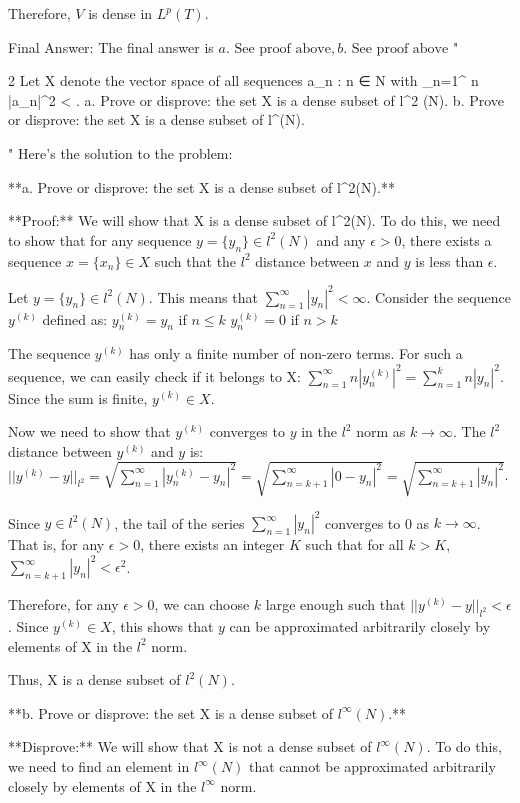     Therefore, $V$ is dense in $L^p(T)$.

Final Answer: The final answer is $\boxed{a. \text{ See proof above}, b. \text{ See proof above}}$
"

2 Let X denote the vector space of all sequences {a_n : n ∈ N} with \sum_{n=1}^{\infty} n |a_n|^2 < \infty.
a. Prove or disprove: the set X is a dense subset of l^2 (N).
b. Prove or disprove: the set X is a dense subset of l^{\infty}(N).

"
Here's the solution to the problem:

**a. Prove or disprove: the set X is a dense subset of l^2(N).**

**Proof:** We will show that X is a dense subset of l^2(N). To do this, we need to show that for any sequence $y = \{y_n\} \in l^2(N)$ and any $\epsilon > 0$, there exists a sequence $x = \{x_n\} \in X$ such that the $l^2$ distance between $x$ and $y$ is less than $\epsilon$.

Let $y = \{y_n\} \in l^2(N)$. This means that $\sum_{n=1}^{\infty} |y_n|^2 < \infty$.
Consider the sequence $y^{(k)}$ defined as:
$y^{(k)}_n = y_n$ if $n \le k$
$y^{(k)}_n = 0$ if $n > k$

The sequence $y^{(k)}$ has only a finite number of non-zero terms. For such a sequence, we can easily check if it belongs to X:
$\sum_{n=1}^{\infty} n |y^{(k)}_n|^2 = \sum_{n=1}^{k} n |y_n|^2$. Since the sum is finite, $y^{(k)} \in X$.

Now we need to show that $y^{(k)}$ converges to $y$ in the $l^2$ norm as $k \to \infty$. The $l^2$ distance between $y^{(k)}$ and $y$ is:
$||y^{(k)} - y||_{l^2} = \sqrt{\sum_{n=1}^{\infty} |y^{(k)}_n - y_n|^2} = \sqrt{\sum_{n=k+1}^{\infty} |0 - y_n|^2} = \sqrt{\sum_{n=k+1}^{\infty} |y_n|^2}$.

Since $y \in l^2(N)$, the tail of the series $\sum_{n=1}^{\infty} |y_n|^2$ converges to 0 as $k \to \infty$. That is, for any $\epsilon > 0$, there exists an integer $K$ such that for all $k > K$, $\sum_{n=k+1}^{\infty} |y_n|^2 < \epsilon^2$.

Therefore, for any $\epsilon > 0$, we can choose $k$ large enough such that $||y^{(k)} - y||_{l^2} < \epsilon$. Since $y^{(k)} \in X$, this shows that $y$ can be approximated arbitrarily closely by elements of X in the $l^2$ norm.

Thus, X is a dense subset of $l^2(N)$.

**b. Prove or disprove: the set X is a dense subset of $l^{\infty}(N)$.**

**Disprove:** We will show that X is not a dense subset of $l^{\infty}(N)$. To do this, we need to find an element in $l^{\infty}(N)$ that cannot be approximated arbitrarily closely by elements of X in the $l^{\infty}$ norm.

